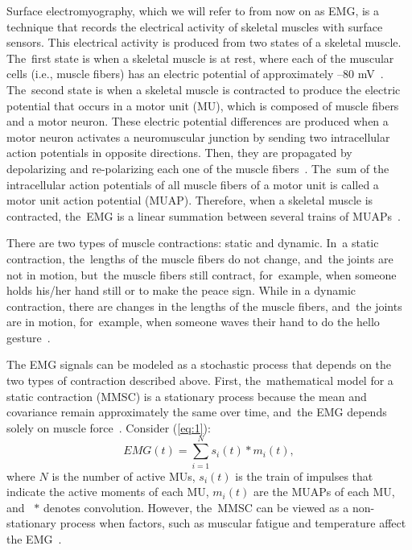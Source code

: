 \documentclass[sensors,review,accept,moreauthors,pdftex]{Definitions/mdpi}
\begin{document}
Surface electromyography, which we will refer to from now on as EMG, is a technique that records the electrical activity of skeletal muscles with surface sensors. This electrical activity is produced from two states of a skeletal muscle. The~first state is when a skeletal muscle is at rest, where each of the muscular cells (i.e., muscle fibers) has an electric potential of approximately --80 mV~\cite{weiss2015easy}. The~second state is when a skeletal muscle is contracted to produce the electric potential that occurs in a motor unit (MU), which is composed of muscle fibers and a motor neuron. These electric potential differences are produced when a motor neuron activates a neuromuscular junction by sending two intracellular action potentials in opposite directions. Then, they are propagated by depolarizing and re-polarizing each one of the muscle fibers~\cite{rodriguez2012emg}. The~sum of the intracellular action potentials of all muscle fibers of a motor unit is called a motor unit action potential (MUAP). Therefore, when a skeletal muscle is contracted, the~EMG is a linear summation between several trains of MUAPs~\cite{weiss2015easy}.

There are two types of muscle contractions: static and dynamic. In~a static contraction, the~lengths of the muscle fibers do not change, and~the joints are not in motion, but~the muscle fibers still contract, for~example, when someone holds his/her hand still or to make the peace sign. While in a dynamic contraction, there are changes in the lengths of the muscle fibers, and~the joints are in motion, for~example, when someone waves their hand to do the hello gesture~\cite{mcgill2004surface}.

The EMG signals can be modeled as a stochastic process that depends on the two types of contraction described above. First, the~mathematical model for a static contraction (MMSC) is a stationary process because the mean and covariance remain approximately the same over time, and~the EMG depends solely on muscle force~\cite{de1975model}. Consider (\ref{eq:1}):
\begin{equation} \label{eq:1}
EMG(t)=\sum_{i=1}^{N}{s_{i}(t)*m_{i}(t)},
\end{equation}
where 
\begin{math}
N
\end{math} is the number of active MUs, 
\begin{math}
s_{i}(t)
\end{math}
is the train of impulses that indicate the active moments of each MU,
\begin{math}
m_{i}(t)
\end{math}
are the MUAPs of each MU, and~ 
\begin{math}
*
\end{math} 
denotes convolution. However, the~MMSC can be viewed as a non-stationary process when factors, such as muscular fatigue and temperature affect the EMG~\cite{Hogan1980}. 
\end{document}
